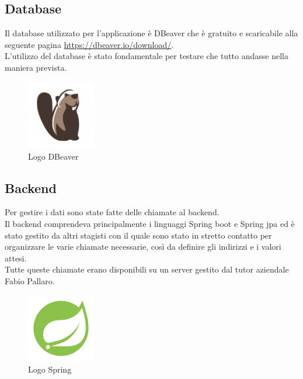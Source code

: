 \newpage

\subsection{Database}
Il database utilizzato per l'applicazione è DBeaver che è gratuito e scaricabile alla seguente pagina \url{https://dbeaver.io/download/}.\\
L'utilizzo del database è stato fondamentale per testare che tutto andasse nella maniera prevista.\\

\begin{figure}[htbp]	
	\centering
	\includegraphics[width=3cm]{immagini/logodbeaver.png}
	\caption{Logo DBeaver}
	\label{fig:Logo DBeaver}
\end{figure}

\subsection{Backend}
Per gestire i dati sono state fatte delle chiamate al backend.\\
Il backend comprendeva principalmente i linguaggi Spring boot e Spring jpa ed è stato gestito da altri stagisti con il quale sono stato in stretto contatto per organizzare le varie chiamate necessarie, così da definire gli indirizzi e i valori attesi.\\
Tutte queste chiamate erano disponibili su un server gestito dal tutor aziendale Fabio Pallaro.\\

\begin{figure}[htbp]	
	\centering
	\includegraphics[width=3cm]{immagini/springlogo.png}
	\caption{Logo Spring}
	\label{fig:Logo Spring}
\end{figure}

\newpage

